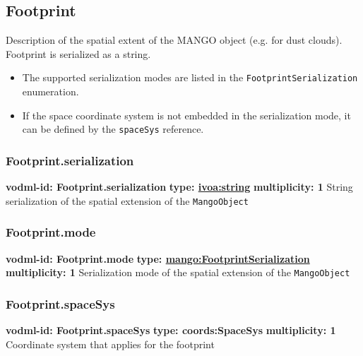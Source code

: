   \subsection{Footprint}
    \label{sect:Footprint}
    Description of the spatial extent of the MANGO object (e.g. for dust clouds). Footprint is serialized as a string. \begin{itemize} \item The supported serialization modes are listed in the \texttt{FootprintSerialization} enumeration. \item If the space coordinate system is not embedded in the serialization mode, it can be defined by the \texttt{spaceSys} reference. \end{itemize}

    \subsubsection{Footprint.serialization}
    \textbf{vodml-id: Footprint.serialization} \newline
    \textbf{type: \hyperref[sect:ivoa]{ivoa:string}} \newline
    \textbf{multiplicity: 1} \newline
    String serialization of the spatial extension of the \texttt{MangoObject}

    \subsubsection{Footprint.mode}
    \textbf{vodml-id: Footprint.mode} \newline
    \textbf{type: \hyperref[sect:FootprintSerialization]{mango:FootprintSerialization}} \newline
    \textbf{multiplicity: 1} \newline
    Serialization mode of the spatial extension of the \texttt{MangoObject} \newline

    \subsubsection{Footprint.spaceSys}
    \textbf{vodml-id: Footprint.spaceSys} \newline
    \textbf{type: coords:SpaceSys} \newline
    \textbf{multiplicity: 1} \newline
    Coordinate system that applies for the footprint

